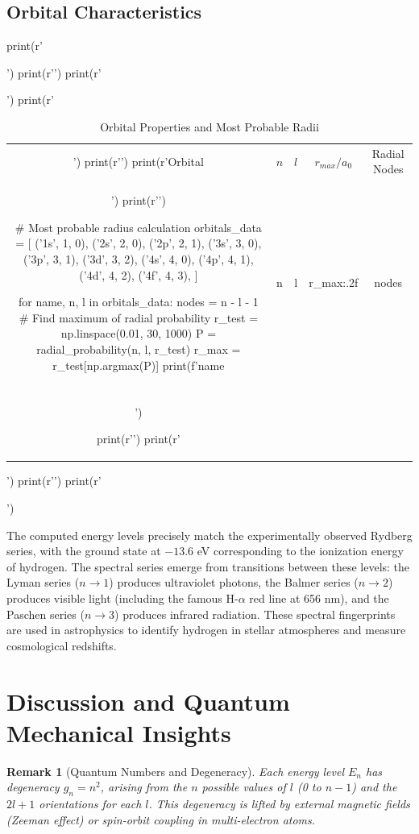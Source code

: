 \documentclass[11pt,a4paper]{article}
\newtheorem{remark}{Remark}[section]
\begin{document}
\subsection{Orbital Characteristics}

\begin{pycode}
print(r'\begin{table}[H]')
print(r'\centering')
print(r'\caption{Orbital Properties and Most Probable Radii}')
print(r'\begin{tabular}{ccccc}')
print(r'\toprule')
print(r'Orbital & $n$ & $l$ & $r_{max}/a_0$ & Radial Nodes \\')
print(r'\midrule')

# Most probable radius calculation
orbitals_data = [
    ('1s', 1, 0),
    ('2s', 2, 0),
    ('2p', 2, 1),
    ('3s', 3, 0),
    ('3p', 3, 1),
    ('3d', 3, 2),
    ('4s', 4, 0),
    ('4p', 4, 1),
    ('4d', 4, 2),
    ('4f', 4, 3),
]

for name, n, l in orbitals_data:
    nodes = n - l - 1
    # Find maximum of radial probability
    r_test = np.linspace(0.01, 30, 1000)
    P = radial_probability(n, l, r_test)
    r_max = r_test[np.argmax(P)]
    print(f'{name} & {n} & {l} & {r_max:.2f} & {nodes} \\\\')

print(r'\bottomrule')
print(r'\end{tabular}')
print(r'\label{tab:orbitals}')
print(r'\end{table}')
\end{pycode}

The computed energy levels precisely match the experimentally observed Rydberg series, with the ground state at $-13.6$ eV corresponding to the ionization energy of hydrogen. The spectral series emerge from transitions between these levels: the Lyman series ($n \to 1$) produces ultraviolet photons, the Balmer series ($n \to 2$) produces visible light (including the famous H-$\alpha$ red line at 656 nm), and the Paschen series ($n \to 3$) produces infrared radiation. These spectral fingerprints are used in astrophysics to identify hydrogen in stellar atmospheres and measure cosmological redshifts.

\section{Discussion and Quantum Mechanical Insights}

\begin{remark}[Quantum Numbers and Degeneracy]
Each energy level $E_n$ has degeneracy $g_n = n^2$, arising from the $n$ possible values of $l$ (0 to $n-1$) and the $2l+1$ orientations for each $l$. This degeneracy is lifted by external magnetic fields (Zeeman effect) or spin-orbit coupling in multi-electron atoms.
\end{remark}
\end{document}
